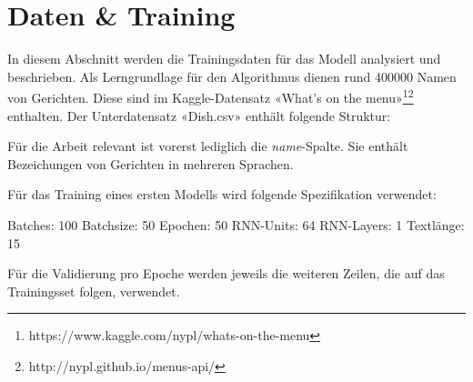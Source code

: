 \section{Daten \& Training}
\label{sec:model-data-training}

In diesem Abschnitt werden die Trainingsdaten für das Modell analysiert und beschrieben.
Als Lerngrundlage für den Algorithmus dienen rund 400000 Namen von Gerichten.
Diese sind im Kaggle-Datensatz «What's on the menu»\footnote{https://www.kaggle.com/nypl/whats-on-the-menu}\footnote{http://nypl.github.io/menus-api/} enthalten.
Der Unterdatensatz «Dish.csv» enthält folgende Struktur:


\begin{center}
\end{center}

Für die Arbeit relevant ist vorerst lediglich die \textit{name}-Spalte.
Sie enthält Bezeichungen von Gerichten in mehreren Sprachen.

Für das Training eines ersten Modells wird folgende Spezifikation verwendet:

Batches: 100
Batchsize: 50
Epochen: 50
RNN-Units: 64
RNN-Layers: 1
Textlänge: 15

Für die Validierung pro Epoche werden jeweils die weiteren Zeilen, die auf das Trainingsset folgen, verwendet.



